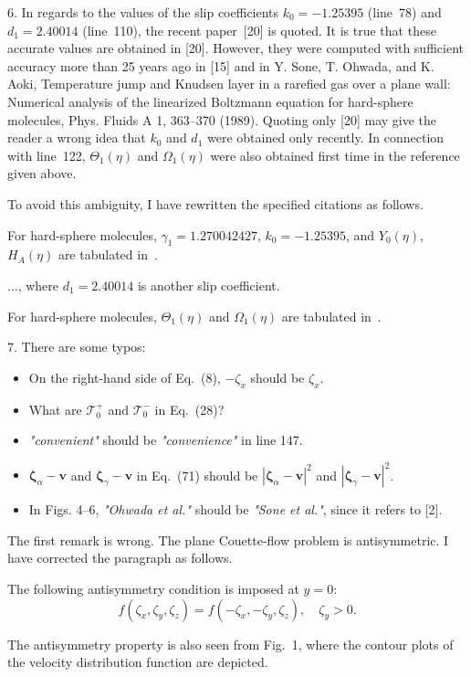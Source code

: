 \documentclass{article}
\newcommand{\bzeta}{\boldsymbol{\zeta}}
\def\asterism{\par\vspace{1em}{\centering\scalebox{1}{\bfseries *~*~*}\par}\vspace{.5em}\par}
\begin{document}
\begin{quoting}
6. In regards to the values of the slip coefficients \(k_0 = −1.25395\) (line~78) and \(d_1 = 2.40014\) (line~110),
the recent paper~[20] is quoted. It is true that these accurate values are obtained in [20].
However, they were computed with sufficient accuracy more than 25 years ago in [15] and
in Y. Sone, T. Ohwada, and K. Aoki, Temperature jump and Knudsen layer in a rarefied gas over a plane wall:
Numerical analysis of the linearized Boltzmann equation for hard-sphere molecules, Phys. Fluids A 1, 363--370 (1989).
Quoting only [20] may give the reader a wrong idea that \(k_0\) and \(d_1\) were obtained only recently.
In connection with line~122, \(\Theta_1(\eta)\) and \(\Omega_1(\eta)\) were also obtained first time in the reference given above.
\end{quoting}

To avoid this ambiguity, I have rewritten the specified citations as follows.
\begin{leftbar}
For hard-sphere molecules, \(\gamma_1 = 1.270042427\), \(k_0 = -1.25395\),
and \(Y_0(\eta)\), \(H_A(\eta)\) are tabulated in~\cite{Ohwada1989creep, Sone2002, Sone2007, Takata2015}.
\asterism
..., where \(d_1 = 2.40014\) is another slip coefficient.
\asterism
For hard-sphere molecules, \(\Theta_1(\eta)\) and \(\Omega_1(\eta)\)
are tabulated in~\cite{Ohwada1989jump, Sone2002, Sone2007, Takata2015}.
\end{leftbar}

\begin{quoting}
7. There are some typos:
\begin{itemize}
    \item On the right-hand side of Eq.~(8), \(-\zeta_x\) should be \(\zeta_x\).
    \item What are \(\mathcal{T}_0^+\) and \(\mathcal{T}_0^-\) in Eq.~(28)?
    \item \emph{"convenient"} should be \emph{"convenience"} in line 147.
    \item \(\bzeta_\alpha-\boldsymbol{v}\) and \(\bzeta_\gamma-\boldsymbol{v}\) in Eq.~(71)
        should be \(|\bzeta_\alpha-\boldsymbol{v}|^2\) and \(|\bzeta_\gamma-\boldsymbol{v}|^2\).
    \item In Figs. 4–6, \emph{"Ohwada et al."} should be \emph{"Sone et al."}, since it refers to [2].
\end{itemize}
\end{quoting}

The first remark is wrong. The plane Couette-flow problem is antisymmetric.
I have corrected the paragraph as follows.
\begin{leftbar}
The following antisymmetry condition is imposed at \(y=0\):
\begin{equation}\label{eq:specular_bc}
    f(\zeta_x,\zeta_y,\zeta_z) = f(-\zeta_x,-\zeta_y,\zeta_z), \quad \zeta_y>0.
\end{equation}
\end{leftbar}
The antisymmetry property is also seen from Fig.~1,
where the contour plots of the velocity distribution function are depicted.
\end{document}
